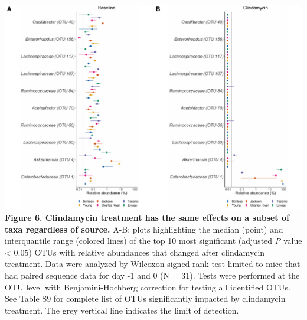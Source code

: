 \documentclass[11pt,]{article}
\begin{document}
\newpage

\includegraphics{figure_6.pdf} \textbf{Figure 6. Clindamycin treatment
has the same effects on a subset of taxa regardless of source.} A-B:
plots highlighting the median (point) and interquantile range (colored
lines) of the top 10 most significant (adjusted \emph{P} value
\textless{} 0.05) OTUs with relative abundances that changed after
clindamycin treatment. Data were analyzed by Wilcoxon signed rank test
limited to mice that had paired sequence data for day -1 and 0 (N = 31).
Tests were performed at the OTU level with Benjamini-Hochberg correction
for testing all identified OTUs. See Table S9 for complete list of OTUs
significantly impacted by clindamycin treatment. The grey vertical line
indicates the limit of detection.

\newpage
\end{document}
